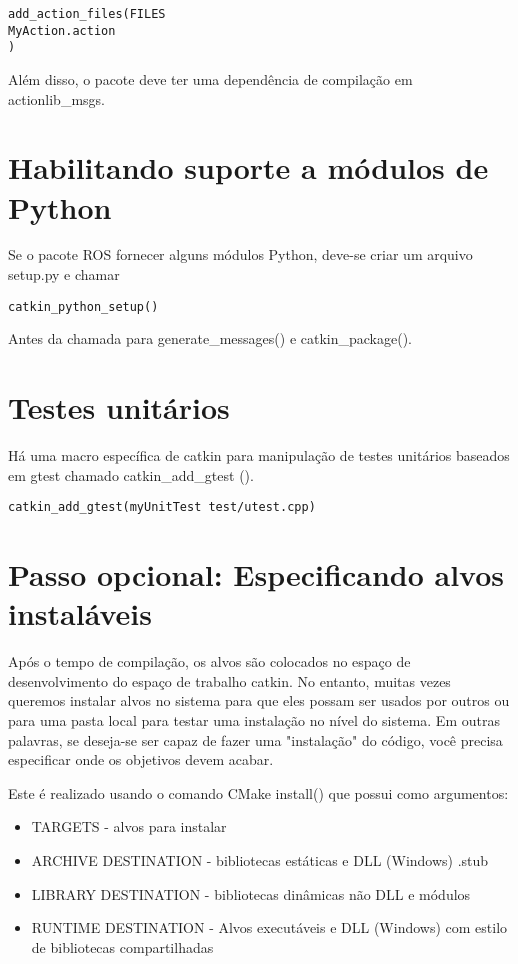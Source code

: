 \begin{verbatim}
add_action_files(FILES
MyAction.action
)
\end{verbatim}


Além disso, o pacote deve ter uma dependência de compilação em actionlib\_msgs.

\section{Habilitando suporte a módulos de Python}


Se o pacote ROS fornecer alguns módulos Python, deve-se criar um arquivo setup.py e chamar

\begin{verbatim}
catkin_python_setup()
\end{verbatim}


Antes da chamada para generate\_messages() e catkin\_package().

\section{Testes unitários}

Há uma macro específica de catkin para manipulação de testes unitários baseados em gtest chamado catkin\_add\_gtest ().

\begin{verbatim}
catkin_add_gtest(myUnitTest test/utest.cpp)
\end{verbatim}

\section{Passo opcional: Especificando alvos instaláveis}


Após o tempo de compilação, os alvos são colocados no espaço de desenvolvimento do espaço de trabalho catkin. No entanto, muitas vezes queremos instalar alvos no sistema para que eles possam ser usados por outros ou para uma pasta local para testar uma instalação no nível do sistema. Em outras palavras, se deseja-se ser capaz de fazer uma "instalação" do código, você precisa especificar onde os objetivos devem acabar.

Este é realizado usando o comando CMake install() que possui como argumentos:

\begin{itemize}
	\setlength{\itemsep}{1pt}
	\setlength{\parskip}{0pt}
	\setlength{\parsep}{0pt}
	\item[] TARGETS - alvos para instalar
	\item[] ARCHIVE DESTINATION - bibliotecas estáticas e DLL (Windows) .stub
	\item[] LIBRARY DESTINATION - bibliotecas dinâmicas não DLL e módulos
	\item[] RUNTIME DESTINATION - Alvos executáveis e DLL (Windows) com estilo de bibliotecas compartilhadas
\end{itemize}

